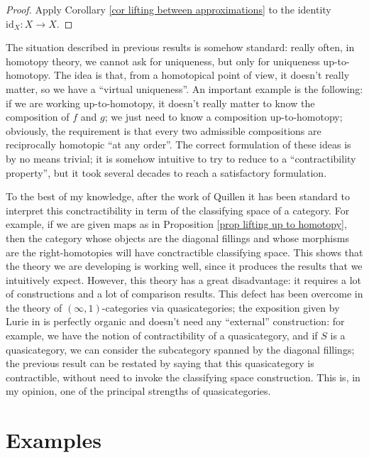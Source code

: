 \begin{refsection}
\begin{proof}
Apply Corollary \ref{cor lifting between approximations} to the identity $\mathrm{id}_X \colon X \to X$.
\end{proof}

\begin{rmk}
The situation described in previous results is somehow standard: really often, in homotopy theory, we cannot ask for uniqueness, but only for uniqueness up-to-homotopy. The idea is that, from a homotopical point of view, it doesn't really matter, so we have a ``virtual uniqueness''. An important example is the following: if we are working up-to-homotopy, it doesn't really matter to know the composition of $f$ and $g$; we just need to know a composition up-to-homotopy; obviously, the requirement is that every two admissible compositions are reciprocally homotopic ``at any order''. The correct formulation of these ideas is by no means trivial; it is somehow intuitive to try to reduce to a ``contractibility property'', but it took several decades to reach a satisfactory formulation.

To the best of my knowledge, after the work of Quillen it has been standard to interpret this conctractibility in term of the classifying space of a category. For example, if we are given maps as in Proposition \ref{prop lifting up to homotopy}, then the category whose objects are the diagonal fillings and whose morphisms are the right-homotopies will have conctractible classifying space. This shows that the theory we are developing is working well, since it produces the results that we intuitively expect. However, this theory has a great disadvantage: it requires a lot of constructions and a lot of comparison results. This defect has been overcome in the theory of $(\infty,1)$-categories via quasicategories; the exposition given by Lurie in \cite{htt} is perfectly organic and doesn't need any ``external'' construction: for example, we have the notion of contractibility of a quasicategory, and if $S$ is a quasicategory, we can consider the subcategory spanned by the diagonal fillings; the previous result can be restated by saying that this quasicategory is contractible, without need to invoke the classifying space construction. This is, in my opinion, one of the principal strengths of quasicategories.
\end{rmk}

\section{Examples}


\end{refsection}
